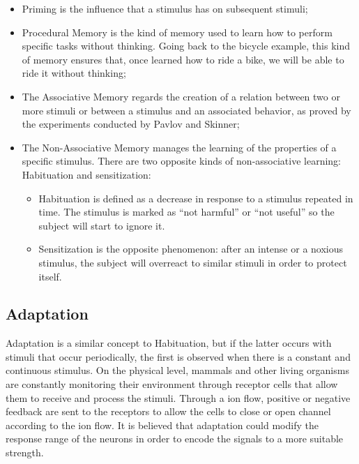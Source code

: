 \documentclass[conference]{IEEEtran}
\begin{document}
		\begin{itemize}
			\item Priming is the influence that a stimulus has on subsequent stimuli;
			\item Procedural Memory is the kind of memory used to learn how to perform specific tasks without thinking. Going back to the bicycle example, this kind of memory ensures that, once learned how to ride a bike, we will be able to ride it without thinking;
			\item The Associative Memory regards the creation of a relation between two or more stimuli or between a stimulus and an associated behavior, as proved by the experiments conducted by Pavlov and Skinner;
			\item The Non-Associative Memory manages the learning of the properties of a specific stimulus. There are two opposite kinds of non-associative learning: Habituation and sensitization:
			\begin{itemize}
				\item Habituation is defined as a decrease in response to a stimulus repeated in time. The stimulus is marked as ``not harmful'' or ``not useful'' so the subject will start to ignore it.
				\item Sensitization is the opposite phenomenon: after an intense or a noxious stimulus, the subject will overreact to similar stimuli in order to protect itself.
			\end{itemize}
		\end{itemize}

	\subsection{Adaptation}\label{Ad}
		Adaptation is a similar concept to Habituation, but if the latter occurs with stimuli that occur periodically, the first is observed when there is a constant and continuous stimulus.
		On the physical level, mammals and other living organisms are constantly monitoring their environment through receptor cells that allow them to receive and process the stimuli. Through a ion flow, positive or negative feedback are sent to the receptors to allow the cells to close or open channel according to the ion flow. \cite{b8}
		It is believed that adaptation could modify the response range of the neurons in order to encode the signals to a more suitable strength. \cite{b9}
\end{document}
